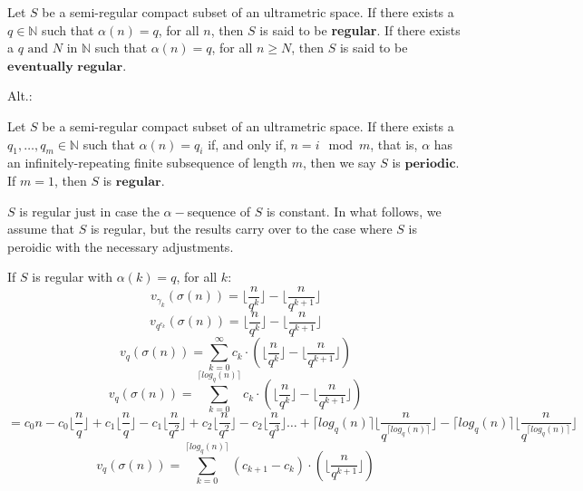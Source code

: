 

\begin{definition}
Let $S$ be a semi-regular compact subset of an ultrametric space. If there exists a $q \in \mathbb{N}$ such that $\alpha(n) = q$, for all $n$, then $S$ is said to be \textbf{regular}. If there exists a $q \text{ and } N$ in $\mathbb{N}$ such that $\alpha(n) = q$, for all $n \geq N$, then $S$ is said to be $\textbf{eventually regular}$.
\end{definition}

Alt.:
\begin{definition}
Let $S$ be a semi-regular compact subset of an ultrametric space. If there exists a $q_1,\ldots,q_m \in \mathbb{N}$ such that $\alpha(n) = q_i$ if, and only if, $n = i \mod m$, that is, $\alpha$ has an infinitely-repeating finite subsequence of length $m$, then we say $S$ is $\textbf{periodic}$. If $m=1$, then $S$ is $\textbf{regular}$. 
\end{definition}

$S$ is regular just in case the $\alpha-$sequence of $S$ is constant. In what follows, we assume that $S$ is regular, but the results carry over to the case where $S$ is peroidic with the necessary adjustments. 

If $S$ is regular with $\alpha(k)=q$, for all $k$:
\[v_{\gamma_k}(\sigma(n)) =  \lfloor\frac{n}{q^k}\rfloor - \lfloor\frac{n}{q^{k+1}}\rfloor \]
\[v_{q^{c_k}}(\sigma(n)) =  \lfloor\frac{n}{q^k}\rfloor - \lfloor\frac{n}{q^{k+1}}\rfloor \]
\[v_{q}(\sigma(n)) =  \sum_{k=0}^{\infty} c_k \cdot(\lfloor\frac{n}{q^k}\rfloor - \lfloor\frac{n}{q^{k+1}}\rfloor) \]
\[v_{q}(\sigma(n)) =  \sum_{k=0}^{\lceil log_q(n) \rceil} c_k \cdot(\lfloor\frac{n}{q^k}\rfloor - \lfloor\frac{n}{q^{k+1}}\rfloor) \]
\[=  c_0{n} - c_0\lfloor\frac{n}{q}\rfloor + c_1\lfloor\frac{n}{q}\rfloor - c_1\lfloor\frac{n}{q^{2}}\rfloor  + c_2\lfloor\frac{n}{q^2}\rfloor - c_2\lfloor\frac{n}{q^{3}}\rfloor \ldots + \lceil log_q(n) \rceil \lfloor\frac{n}{q^{\lceil log_q(n) \rceil}}\rfloor - \lceil log_q(n) \rceil\lfloor\frac{n}{q^{\lceil log_q(n) \rceil}}\rfloor  \]
\[v_{q}(\sigma(n)) =  \sum_{k=0}^{\lceil log_q(n) \rceil} (c_{k+1} - c_k) \cdot(\lfloor\frac{n}{q^{k+1}}\rfloor) \]

